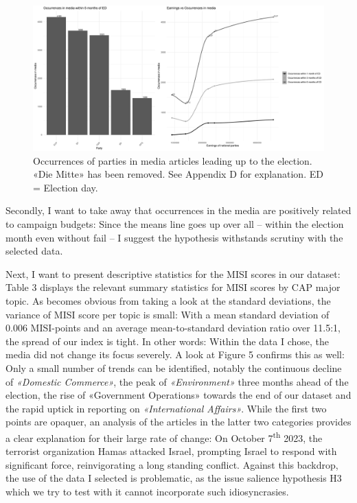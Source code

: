 \documentclass[11pt,a4paper]{article}
\begin{document}
\begin{figure}
    \centering
    \includegraphics[width=1\linewidth]{output/plots/plot_figure_4.png}
    \caption{Occurrences of parties in media articles leading up to the election. «Die Mitte» has been removed. See Appendix D for explanation. ED = Election day.
}
    \label{fig:enter-label}
\end{figure}

Secondly, I want to take away that occurrences in the media are positively related to campaign budgets: Since the means line goes up over all – within the election month even without fail – I suggest the hypothesis withstands scrutiny with the selected data.

Next, I want to present descriptive statistics for the MISI scores in our dataset: Table 3 displays the relevant summary statistics for MISI scores by CAP major topic. As becomes obvious from taking a look at the standard deviations, the variance of MISI score per topic is small: With a mean standard deviation of 0.006 MISI-points and an average mean-to-standard deviation ratio over 11.5:1, the spread of our index is tight. In other words: Within the data I chose, the media did not change its focus severely. A look at Figure 5 confirms this as well: Only a small number of trends can be identified, notably the continuous decline of \textit{«Domestic Commerce»}, the peak of \textit{«Environment»} three months ahead of the election, the rise of «Government Operations» towards the end of our dataset and the rapid uptick in reporting on \textit{«International Affairs»}. While the first two points are opaquer, an analysis of the articles in the latter two categories provides a clear explanation for their large rate of change: On October 7\textsuperscript{th} 2023, the terrorist organization Hamas attacked Israel, prompting Israel to respond with significant force, reinvigorating a long standing conflict. Against this backdrop, the use of the data I selected is problematic, as the issue salience hypothesis H3 which we try to test with it cannot incorporate such idiosyncrasies.
\end{document}

